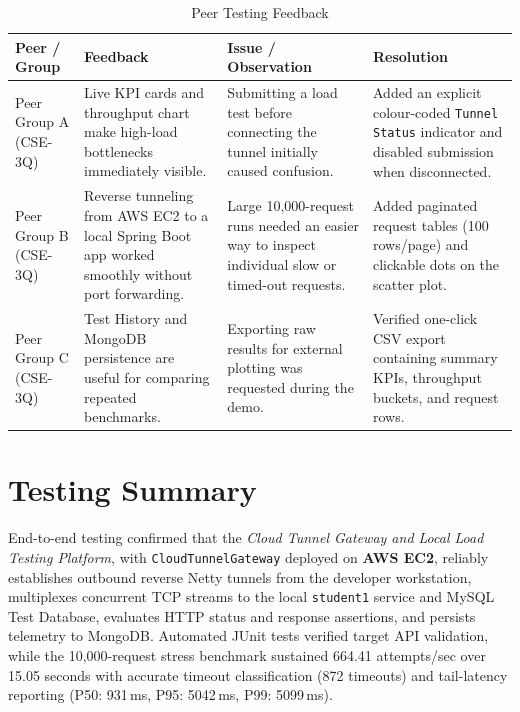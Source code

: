\documentclass[11pt,a4paper]{report}
\begin{document}
\begin{table}[!htbp]
\centering
\small
\caption{Peer Testing Feedback}
\label{tab:peer_testing}
\begin{tabularx}{\linewidth}{|L{2.5cm}|Y|Y|Y|}
\hline
\textbf{Peer / Group} & \textbf{Feedback} & \textbf{Issue / Observation} & \textbf{Resolution} \\
\hline
Peer Group A (CSE-3Q) & Live KPI cards and throughput chart make high-load bottlenecks immediately visible. & Submitting a load test before connecting the tunnel initially caused confusion. & Added an explicit colour-coded \texttt{Tunnel Status} indicator and disabled submission when disconnected. \\
\hline
Peer Group B (CSE-3Q) & Reverse tunneling from AWS EC2 to a local Spring Boot app worked smoothly without port forwarding. & Large 10,000-request runs needed an easier way to inspect individual slow or timed-out requests. & Added paginated request tables (100 rows/page) and clickable dots on the scatter plot. \\
\hline
Peer Group C (CSE-3Q) & Test History and MongoDB persistence are useful for comparing repeated benchmarks. & Exporting raw results for external plotting was requested during the demo. & Verified one-click CSV export containing summary KPIs, throughput buckets, and request rows. \\
\hline
\end{tabularx}
\end{table}

\section{Testing Summary}

End-to-end testing confirmed that the \textit{Cloud Tunnel Gateway and Local Load Testing Platform}, with \texttt{CloudTunnelGateway} deployed on \textbf{AWS EC2}, reliably establishes outbound reverse Netty tunnels from the developer workstation, multiplexes concurrent TCP streams to the local \texttt{student1} service and MySQL Test Database, evaluates HTTP status and response assertions, and persists telemetry to MongoDB. Automated JUnit tests verified target API validation, while the 10,000-request stress benchmark sustained 664.41 attempts/sec over 15.05 seconds with accurate timeout classification (872 timeouts) and tail-latency reporting (P50: 931\,ms, P95: 5042\,ms, P99: 5099\,ms).
\end{document}
